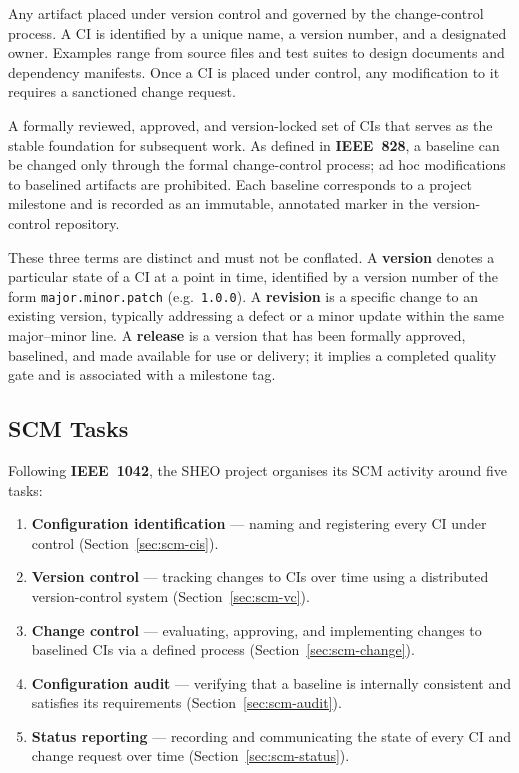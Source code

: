 \begin{description}[leftmargin=1.6cm, style=nextline]
  \item[Configuration Item (CI)]
    Any artifact placed under version control and governed by the change-control
    process. A CI is identified by a unique name, a version number, and a
    designated owner. Examples range from source files and test suites to design
    documents and dependency manifests. Once a CI is placed under control, any
    modification to it requires a sanctioned change request.

  \item[Baseline]
    A formally reviewed, approved, and version-locked set of CIs that serves as
    the stable foundation for subsequent work. As defined in \textbf{IEEE~828}, a
    baseline can be changed only through the formal change-control process; ad hoc
    modifications to baselined artifacts are prohibited. Each baseline corresponds
    to a project milestone and is recorded as an immutable, annotated marker in the
    version-control repository.

  \item[Version / Revision / Release]
    These three terms are distinct and must not be conflated. A \textbf{version}
    denotes a particular state of a CI at a point in time, identified by a
    version number of the form \texttt{major.minor.patch} (e.g.\ \texttt{1.0.0}).
    A \textbf{revision} is a specific change to an existing version, typically
    addressing a defect or a minor update within the same major--minor line. A
    \textbf{release} is a version that has been formally approved, baselined, and
    made available for use or delivery; it implies a completed quality gate and is
    associated with a milestone tag.
\end{description}

\subsection{SCM Tasks}

Following \textbf{IEEE~1042}, the SHEO project organises its SCM activity around
five tasks:

\begin{enumerate}[label=\arabic*.]
  \item \textbf{Configuration identification} --- naming and registering every CI
    under control (Section~\ref{sec:scm-cis}).
  \item \textbf{Version control} --- tracking changes to CIs over time using a
    distributed version-control system (Section~\ref{sec:scm-vc}).
  \item \textbf{Change control} --- evaluating, approving, and implementing
    changes to baselined CIs via a defined process
    (Section~\ref{sec:scm-change}).
  \item \textbf{Configuration audit} --- verifying that a baseline is internally
    consistent and satisfies its requirements
    (Section~\ref{sec:scm-audit}).
  \item \textbf{Status reporting} --- recording and communicating the state of
    every CI and change request over time
    (Section~\ref{sec:scm-status}).
\end{enumerate}

